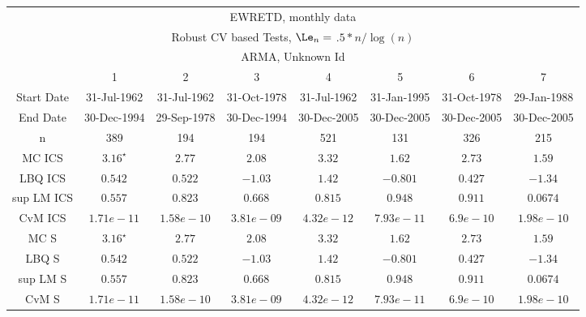  \begin{table}[H] 
 \tiny 
 \centering 
\begin{tabular}{|c|c|c|c|c|c|c|c|} 
\multicolumn{8}{c}{ EWRETD, monthly data } \\ 
\multicolumn{8}{c}{ Robust CV based Tests, $\Le_n =$ $.5*n/\log(n)$ } \\ 
\multicolumn{8}{c}{ ARMA, Unknown Id } \\ 
 \hline 
 &  1  &  2  &  3  &  4  &  5  &  6  &  7    \\ 
 Start Date &  31-Jul-1962 &  31-Jul-1962 &  31-Oct-1978 &  31-Jul-1962 &  31-Jan-1995 &  31-Oct-1978 &  29-Jan-1988 \\ 
 End Date &  30-Dec-1994 &  29-Sep-1978 &  30-Dec-1994 &  30-Dec-2005 &  30-Dec-2005 &  30-Dec-2005 &  30-Dec-2005 \\ 
 n &   389  &   194  &   194  &   521  &   131  &   326  &   215  \\ 
 \hline 
 MC ICS &   $ 3.16^{\star } $  &   $ 2.77^{} $  &   $ 2.08^{} $  &   $ 3.32^{} $  &   $ 1.62^{} $  &   $ 2.73^{} $  &   $ 1.59^{} $  \\ 
 LBQ ICS &   $ 0.542^{} $  &   $ 0.522^{} $  &   $ -1.03^{} $  &   $ 1.42^{} $  &   $ -0.801^{} $  &   $ 0.427^{} $  &   $ -1.34^{} $  \\ 
 sup LM ICS &   $ 0.557^{} $  &   $ 0.823^{} $  &   $ 0.668^{} $  &   $ 0.815^{} $  &   $ 0.948^{} $  &   $ 0.911^{} $  &   $ 0.0674^{} $  \\ 
 CvM ICS &   $ 1.71e-11^{} $  &   $ 1.58e-10^{} $  &   $ 3.81e-09^{} $  &   $ 4.32e-12^{} $  &   $ 7.93e-11^{} $  &   $ 6.9e-10^{} $  &   $ 1.98e-10^{} $  \\ 
 \hline 
 MC S &   $ 3.16^{\star } $  &   $ 2.77^{} $  &   $ 2.08^{} $  &   $ 3.32^{} $  &   $ 1.62^{} $  &   $ 2.73^{} $  &   $ 1.59^{} $  \\ 
 LBQ S &   $ 0.542^{} $  &   $ 0.522^{} $  &   $ -1.03^{} $  &   $ 1.42^{} $  &   $ -0.801^{} $  &   $ 0.427^{} $  &   $ -1.34^{} $  \\ 
 sup LM S &   $ 0.557^{} $  &   $ 0.823^{} $  &   $ 0.668^{} $  &   $ 0.815^{} $  &   $ 0.948^{} $  &   $ 0.911^{} $  &   $ 0.0674^{} $  \\ 
 CvM S &   $ 1.71e-11^{} $  &   $ 1.58e-10^{} $  &   $ 3.81e-09^{} $  &   $ 4.32e-12^{} $  &   $ 7.93e-11^{} $  &   $ 6.9e-10^{} $  &   $ 1.98e-10^{} $  \\ 
 \hline 
\end{tabular}
 \end{table}
